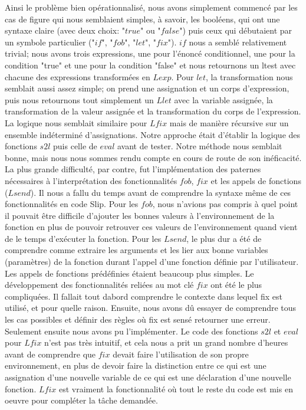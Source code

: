 \documentclass{article}
\begin{document}
	Ainsi le problème bien opérationnalisé, nous avons simplement commencé par les
	cas de figure qui nous semblaient simples, à savoir, les booléens, qui ont une syntaxe claire (avec deux choix: "$true$" ou "$false$") puis ceux qui débutaient
	par un symbole particulier ("$if$", "$fob$", "$let$", "$fix$"). $if$ nous a semblé
	relativement trivial; nous avons trois expressions, une pour l'énoncé conditionnel,
	une pour la condition "true" et une pour la condition "false" et nous
	retournons un ltest avec chacune des expressions transformées en $Lexp$. Pour $l
	et$, la transformation nous semblait aussi assez simple; on prend une assignation
	et un corps d'expression, puis nous retournons tout simplement un $Llet$ avec
	la variable assignée, la transformation de la valeur assignée et la transformation
	du corps de l'expression. La logique nous semblait similaire pour $Lfix$ mais
	de manière récursive sur un ensemble indéterminé d'assignations. Notre approche
	était d'établir la logique des fonctions $s2l$ puis celle de $eval$ avant de
	tester. Notre méthode nous semblait bonne, mais nous nous sommes rendu compte en
	cours de route de son inéficacité. La plus grande difficulté, par contre, fut
	l'implémentation des paternes nécessaires à l'interprétation des
	fonctionnalités $fob$, $fix$ et les appels de fonctions ($Lsend$). Il nous a
	fallu du temps avant de comprendre la syntaxe même de ces fonctionnalités en
	code Slip. Pour les $fob$, nous n'avions pas compris à quel point il pouvait
	être difficile d'ajouter les bonnes valeurs à l'environnement de la fonction
	en plus de pouvoir retrouver ces valeurs de l'environnement quand vient de le
	temps d'exécuter la fonction. Pour les $Lsend$, le plus dur a été de
	comprendre comme extraire les arguments et les lier aux bonne variables (paramètres)
	de la fonction durant l'appel d'une fonction définie par l'utilisateur. Les appels
	de fonctions prédéfinies étaient beaucoup plus simples. Le développement des
	fonctionnalités reliées au mot clé $fix$ ont été le plus compliquées. Il fallait
	tout dabord comprendre le contexte dans lequel fix est utilisé, et pour quelle
	raison. Ensuite, nous avons dû essayer de comprendre tous les cas possibles et
	définir des règles où fix est sensé retourner une erreur. Seulement ensuite nous
	avons pu l'implémenter. Le code des fonctions $s2l$ et $eval$ pour $Lfix$ n'est
	pas très intuitif, et cela nous a prit un grand nombre d'heures avant de comprendre
	que $fix$ devait faire l'utilisation de son propre environnement, en plus de
	devoir faire la distinction entre ce qui est une assignation d'une nouvelle
	variable de ce qui est une déclaration d'une nouvelle fonction. $Lfix$ est vraiment
	la fonctionnalité où tout le reste du code est mis en oeuvre pour compléter la tâche
	demandée.
\end{document}
